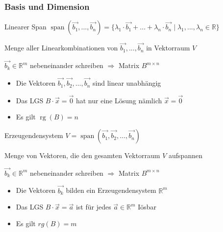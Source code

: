 \subsubsection*{Basis und Dimension}

\begin{definition}{Linearer Span} $\operatorname{span}(\vec{b_{1}}, ..., \vec{b_{n}})=\{\lambda_{1} \cdot \vec{b_{1}}+ ... +\lambda_{n} \cdot \vec{b_{n}} \mid \lambda_{1}, ..., \lambda_{n} \in \mathbb{R}\}$
    
    \vspace{1mm}
    
    {\small Menge aller Linearkombinationen von $\vec{b_{1}}, ..., \vec{b_{n}}$ in Vektorraum $V$}

    \vspace{1mm}

    {\small $\overrightarrow{b_{k}} \in \mathbb{R}^{m}$ nebeneinander schreiben $\Rightarrow$ Matrix $B^{m \times n}$ }

    \vspace{1mm}

    \begin{itemize}
        \item Die Vektoren $\overrightarrow{b_{1}}, \overrightarrow{b_{2}}, \ldots, \overrightarrow{b_{n}}$ sind linear unabhängig
        \item Das LGS $B \cdot \vec{x}=\overrightarrow{0}$ hat nur eine Lösung nämlich $\vec{x}=\overrightarrow{0}$
        \item Es gilt $\operatorname{rg}(B)=n$
    \end{itemize}
\end{definition}

\begin{concept}{Erzeugendensystem} $V=\operatorname{span}(\overrightarrow{b_{1}}, \overrightarrow{b_{2}}, \ldots, \overrightarrow{b_{n}})$
    
    \vspace{1mm}
    
    {\small Menge von Vektoren, die den gesamten Vektorraum $V$ aufspannen}

    \vspace{1mm}

    {\small $\overrightarrow{b_{k}} \in \mathbb{R}^{m}$ nebeneinander schreiben $\Rightarrow$ Matrix $B^{m \times n}$ }

    \vspace{1mm}

    \begin{itemize}
        \item Die Vektoren $\overrightarrow{b_{k}}$ bilden ein Erzeugendensystem $\mathbb{R}^{m}$
        \item Das LGS $B \cdot \vec{x}=\vec{a}$ ist für jedes $\vec{a} \in \mathbb{R}^{m}$ Iösbar
        \item Es gilt $r g(B)=m$
    \end{itemize}
\end{concept}

